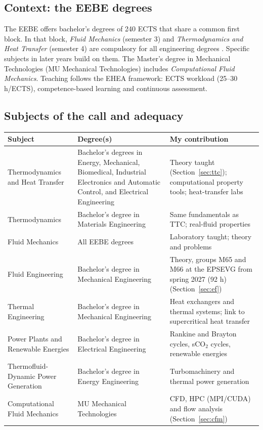 \documentclass[11pt]{article}
\begin{document}
\subsection{Context: the EEBE degrees}
The EEBE offers bachelor's degrees of 240 ECTS that share a common first block. In that
block, \emph{Fluid Mechanics} (semester 3) and \emph{Thermodynamics and Heat Transfer}
(semester 4) are compulsory for all engineering degrees . Specific subjects in later years build on them. The Master's
degree in Mechanical Technologies (MU Mechanical Technologies) includes
\emph{Computational Fluid Mechanics}. Teaching follows the EHEA framework: ECTS
workload (25--30 h/ECTS), competence-based learning and continuous assessment.

\subsection{Subjects of the call and adequacy}
\begin{center}
\small
\begin{tabularx}{\textwidth}{@{}p{3.9cm}p{3.6cm}X@{}}
\toprule
\textbf{Subject} & \textbf{Degree(s)} & \textbf{My contribution} \\
\midrule
Thermodynamics and Heat Transfer & Bachelor's degrees in Energy, Mechanical, Biomedical, Industrial Electronics and Automatic Control, and Electrical Engineering & Theory taught (Section~\ref{sec:ttc}); computational property tools; heat-transfer labs \\
Thermodynamics & Bachelor's degree in Materials Engineering & Same fundamentals as TTC; real-fluid properties \\
Fluid Mechanics & All EEBE degrees & Laboratory taught; theory and problems \\
Fluid Engineering & Bachelor's degree in Mechanical Engineering & Theory, groups M65 and M66 at the EPSEVG from spring 2027 (92 h) (Section~\ref{sec:ef}) \\
Thermal Engineering & Bachelor's degree in Mechanical Engineering & Heat exchangers and thermal systems; link to supercritical heat transfer \\
Power Plants and Renewable Energies & Bachelor's degree in Electrical Engineering & Rankine and Brayton cycles, sCO$_2$ cycles, renewable energies \\
Thermofluid-Dynamic Power Generation & Bachelor's degree in Energy Engineering & Turbomachinery and thermal power generation \\
Computational Fluid Mechanics & MU Mechanical Technologies & CFD, HPC (MPI/CUDA) and flow analysis (Section~\ref{sec:cfm}) \\
\bottomrule
\end{tabularx}
\end{center}
\end{document}
